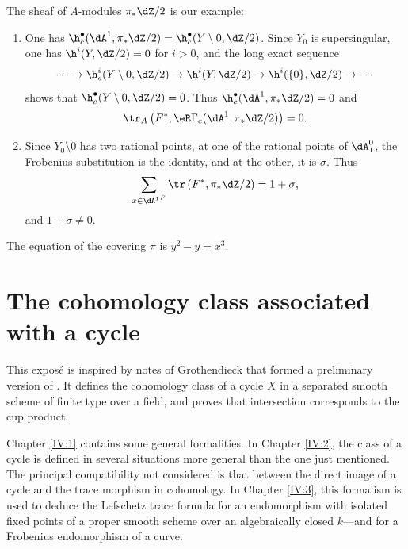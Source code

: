 \documentclass[oneside]{book}
\begin{document}
The sheaf of $A$-modules $\pi_*\dZ/2$ is our example:
\begin{enumerate}[\indent a)]
  \item One has
    $\h_c^\bullet(\dA^1,\pi_*\dZ/2) = \h_c^\bullet(Y\setminus 0,\dZ/2)$.
    Since $Y_0$ is supersingular, one has $\h^i(Y,\dZ/2)=0$ for $i>0$, and
    the long exact sequence
    \[
      \cdots \to \h_c^i(Y\setminus 0,\dZ/2) \to \h^i(Y,\dZ/2) \to \h^i(\{0\},\dZ/2) \to \cdots
    \]
    shows that $\h_c^\bullet(Y\setminus 0,\dZ/2)=0$. Thus
    $\h_c^\bullet(\dA^1,\pi_*\dZ/2)=0$ and
    \[
      \tr_A\left(F^*,\eR\Gamma_c(\dA^1,\pi_*\dZ/2)\right) = 0 \text{.}
    \]
  \item Since $Y_0\setminus 0$ has two rational points, at one of the
    rational points of $\dA_1^0$, the Frobenius substitution is the identity,
    and at the other, it is $\sigma$. Thus
    \[
      \sum_{x\in {\dA^1}^F} \tr\left(F^*,\pi_*\dZ/2\right) = 1+\sigma \text{,}
    \]
    and $1+\sigma\ne 0$.
\end{enumerate}

The equation of the covering $\pi$ is $y^2-y=x^3$.



\chapter{The cohomology class associated with a cycle}\label{IV}





This exposé is inspired by notes of Grothendieck that formed a preliminary
version of \cite[IV]{sga5}. It defines the cohomology class of a cycle $X$ in
a separated smooth scheme of finite type over a field, and proves that
intersection corresponds to the cup product.

Chapter \ref{IV:1} contains some general formalities. In Chapter \ref{IV:2},
the class of a cycle is defined in several situations more general than the
one just mentioned. The principal compatibility not considered is that
between the direct image of a cycle and the trace morphism in cohomology. In
Chapter \ref{IV:3}, this formalism is used to deduce the Lefschetz trace
formula for an endomorphism with isolated fixed points of a proper smooth
scheme over an algebraically closed $k$---and for a Frobenius endomorphism of
a curve.
\end{document}
